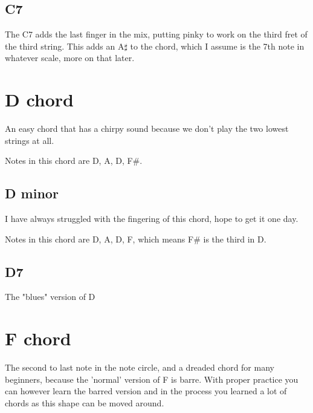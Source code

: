 \documentclass[11pt]{book}
\begin{document}
    \subsection{C7}
    The C7 adds the last finger in the mix, putting pinky to work on the third fret of the third string.
    This adds an A$\sharp$ to the chord, which I assume is the 7th note in whatever scale, more on that later.

    \chordscheme[
        name = C7,
        mute = {6},
        finger = {3/5:3, 2/4:2, 3/3:4, 1/2:1},
        ring = {1}
    ]


    \section{D chord}
    An easy chord that has a chirpy sound because we don't play the two lowest strings at all.

    \chordscheme[
        name = D,
        finger = {2/3:1, 3/2:3, 2/1:2},
        ring = {4},
        mute = {6,5}
    ]

    Notes in this chord are D, A, D, F\#.

    \subsection{D minor}
    I have always struggled with the fingering of this chord, hope to get it one day.

    \chordscheme[
        name = Dm,
        finger = {2/3:2, 3/2:3, 1/1:1},
        ring = {4},
        mute = {5,6}
    ]

    Notes in this chord are D, A, D, F, which means F\# is the third in D.

    \subsection{D7}
    The "blues" version of D

    \chordscheme[
        name = D7,
        finger = {1/2:1, 2/3:2, 2/1:3},
        ring = {4},
        mute = {5,6}
    ]


    \section{F chord}
    The second to last note in the note circle, and a dreaded chord for many beginners, because the 'normal' version of
    F is barre.
    With proper practice you can however learn the barred version and in the process you learned a lot of chords as this shape can be moved around.
\end{document}
